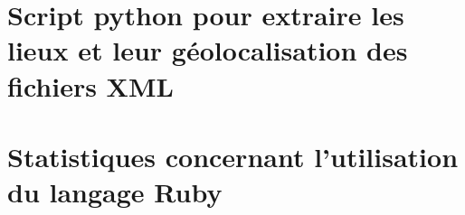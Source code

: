 \documentclass[a4paper,12pt,twoside]{book}
\begin{document}
	\chapter[Extraction des lieux]{Script python pour extraire les lieux et leur géolocalisation des fichiers XML}
            

        \chapter{Statistiques concernant l'utilisation du langage Ruby}
            
	
	\backmatter


 \listoffigures


	\tableofcontents
	
\end{document}
